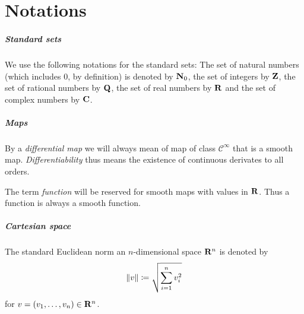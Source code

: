 \chapter*{Notations}

\paragraph{Standard sets}
We use the following notations for the standard sets: The set of natural
numbers (which includes $0$, by definition) is denoted by $\mathbf{N}_0$, the set
of integers by $\mathbf{Z}$, the set of rational numbers by $\mathbf{Q}$, the set of
real numbers by $\mathbf{R}$ and the set of complex numbers by $\mathbf{C}$.

\paragraph{Maps}

By a \emph{differential map} we will always mean of map of class $\mathcal C^\infty$
that is a smooth map. \emph{Differentiability} thus means the existence of
continuous derivates to all orders.

The term \emph{function} will be reserved for smooth maps with values in $\mathbf{R}$.
Thus a function is always a smooth function.

\paragraph{Cartesian space}
The standard Euclidean norm an $n$-dimensional space $\mathbf{R}^n$ is denoted
by
\[
    \lVert v\rVert \coloneqq \sqrt{\sum_{i = 1}^n v_i^2}
\]
for $v = (v_1, \dotsc, v_n) \in \mathbf{R}^n$.
